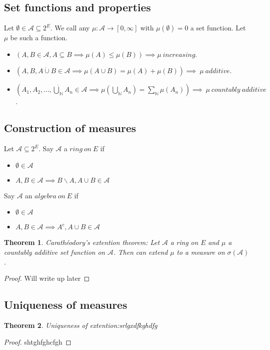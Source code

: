 \documentclass{article}
\newtheorem{theorem}{Theorem}[section]
\begin{document}
\subsection{Set functions and properties}
Let $\emptyset\in\mathcal{A}\subseteq2^E$.  We call any $\mu:\mathcal{A}\rightarrow[0,\infty]$ with $\mu(\emptyset)=0$ a set function.  Let $\mu$ be such a function.
\begin{itemize}
  \item $(A,B\in\mathcal{A},A\subseteq B \implies \mu(A)\leq\mu(B))\implies \mu~increasing$.
  \item $(A,B,A\dot{\cup} B \in \mathcal{A}\implies \mu(A\cup B)=\mu(A)+\mu(B))\implies~\mu~additive$.
  \item $(A_1,A_2,...,\dot{\bigcup}_\mathbb{N} A_n \in \mathcal{A}\implies \mu(\bigcup_\mathbb{N}A_n)=\sum_\mathbb{N}\mu(A_n))\implies~\mu~countably~additive$.
\end{itemize}

\subsection{Construction of measures}
Let $\mathcal{A}\subseteq2^E$.  Say $\mathcal{A}$ a $ring~on~E$ if
\begin{itemize}
  \item $\emptyset\in\mathcal{A}$
  \item $A,B\in\mathcal{A}\implies B\backslash A,A\cup B\in\mathcal{A}$
\end{itemize}
Say $\mathcal{A}$ an $algebra~on~E$ if
\begin{itemize}
  \item $\emptyset\in\mathcal{A}$
  \item $A,B\in\mathcal{A}\implies A^c,A\cup B\in\mathcal{A}$
\end{itemize}
\begin{theorem}
  Carath\'eodory's extention theorem: Let $\mathcal{A}$ a ring on $E$ and $\mu$ a countably additive set function on $\mathcal{A}$.  Then can extend $\mu$ to a measure on $\sigma(\mathcal{A})$.
\end{theorem}
\begin{proof}
  Will write up later
\end{proof}
\subsection{Uniqueness of measures}
\begin{theorem}
  Uniqueness of extention:srlgxdfkghdfg
\end{theorem}
\begin{proof}
  shtghfghcfgh
\end{proof}
\end{document}
